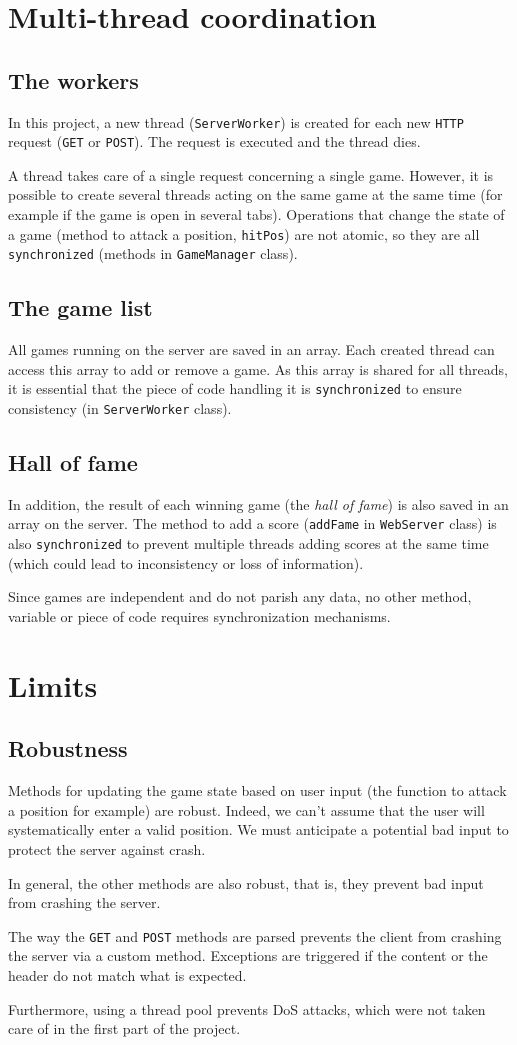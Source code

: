 \documentclass[a4paper, 12pt]{article}
\begin{document}
	\section{Multi-thread coordination}
	\subsection{The workers}
	In this project, a new thread (\texttt{ServerWorker}) is created for each new \texttt{HTTP} request (\texttt{GET} or \texttt{POST}). The request is executed and the thread dies.\par
	A thread takes care of a single request concerning a single game. However, it is possible to create several threads acting on the same game at the same time (for example if the game is open in several tabs). Operations that change the state of a game (method to attack a position, \texttt{hitPos}) are not atomic, so they are all \texttt{synchronized} (methods in \texttt{GameManager} class).
	\subsection{The game list}
	All games running on the server are saved in an array. Each created thread can access this array to add or remove a game. As this array is shared for all threads, it is essential that the piece of code handling it is \texttt{synchronized} to ensure consistency (in \texttt{ServerWorker} class).
	\subsection{Hall of fame}
	In addition, the result of each winning game (the {\it hall of fame}) is also saved in an array on the server. The method to add a score (\texttt{addFame} in \texttt{WebServer} class) is also \texttt{synchronized} to prevent multiple threads adding scores at the same time (which could lead to inconsistency or loss of information).\par
	Since games are independent and do not parish any data, no other method, variable or piece of code requires synchronization mechanisms.
	\section{Limits}
	\subsection{Robustness}
	Methods for updating the game state based on user input (the function to attack a position for example) are robust. Indeed, we can't assume that the user will systematically enter a valid position. We must anticipate a potential bad input to protect the server against crash.\par
	In general, the other methods are also robust, that is, they prevent bad input from crashing the server.\par
	The way the \texttt{GET} and \texttt{POST} methods are parsed prevents the client from crashing the server via a custom method. Exceptions are triggered if the content or the header do not match what is expected.\par
	Furthermore, using a thread pool prevents DoS attacks, which were not taken care of in the first part of the project.
\end{document}
